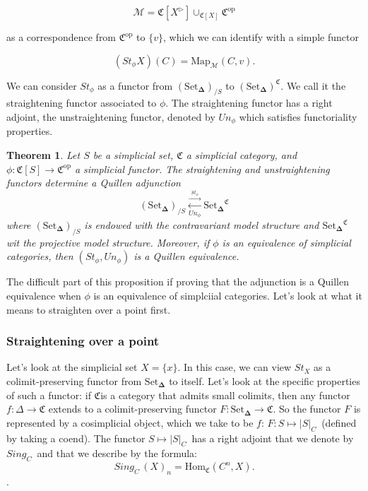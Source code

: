 \documentclass[12pt]{amsart}
\newcommand{\8}{\ensuremath{\infty}}
\newcommand{\C}{\ensuremath{\mathfrak{C}}}
\newcommand{\SSet}{\ensuremath{\text{Set}_{\boldsymbol{\Delta}}}}
\newcommand{\op}[1]{\ensuremath{{#1}^{\text{op}}}}
\newcommand{\adj}[2]{\ensuremath{\overset{\overset{#1}{ \rightarrow}}{\underset{#2}{\leftarrow}}}}
\newcommand{\Hom}{\ensuremath{\text{Hom}}}
\newtheorem{theorem}{Theorem}
\begin{document}
$$
  \mathcal{M} = \mathfrak{C}[X^{\triangleright}]\displaystyle \cup_{\mathfrak{C}[X]}\op\C
$$

as a correspondence from $\op\C$ to $\{v\}$, which we can identify with a simple functor

$$
  (St_\phi X)(C)=\text{Map}_\mathcal{M}(C, v).
$$

We can consider $St_\phi$ as a functor from $(\SSet)_{/S}$ to $(\SSet)^\C$. We call it the straightening functor associated to $\phi$.
The straightening functor has a right adjoint, the unstraightening functor, denoted by $Un_\phi$ which satisfies functoriality properties.

\begin{theorem}
  Let $S$ be a simplicial set, $\C$ a simplicial category, and $\phi: \mathfrak{C}[S] \rightarrow\op\C$ a simplicial functor. The straightening and unstraightening functors determine a Quillen adjunction
  $$
    (\SSet)_{/S}\adj{St_\phi}{Un_\phi} \SSet^\C
  $$
  where $(\SSet)_{/S}$ is endowed with the contravariant model structure and $\SSet^\C$ wit the projective model structure. Moreover, if $\phi$ is an equivalence of simplicial categories, then $(St_\phi,Un_\phi)$ is a Quillen equivalence.
\end{theorem}

The difficult part of this proposition if proving that the adjunction is a Quillen equivalence when $\phi$ is an equivalence of simplciial categories. Let's look at what it means to straighten over a point first.

\subsubsection{Straightening over a point}

Let's look at the simplicial set $X = \{x\}$. In this case, we can view $St_X$ as a colimit-preserving functor from $\SSet$ to itself. Let's look at the specific properties of such a functor: if \C is a category that admits small colimits, then any functor $f:\Delta \rightarrow \C$ extends to a colimit-preserving functor $F:\SSet\rightarrow \C$. So the functor $F$ is represented by a cosimplicial object, which we take to be $f$: $F:S\mapsto \vert S\vert_{C^\cdot}$ (defined by taking a coend). The functor $S\mapsto\vert S\vert_{C^\cdot}$ has a right adjoint that we denote by $Sing_{C^\cdot}$ and that we describe by the formula:
\[Sing_{C^\cdot}(X)_n = \Hom_\C(C^n,X).\] . 
\end{document}
